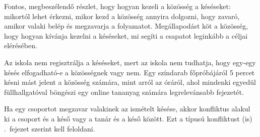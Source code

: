 Fontos, megbeszélendő részlet, hogy hogyan kezeli a közösség a késéseket: mikortól lehet érkezni, mikor kezd a közösség annyira dolgozni, hogy zavaró, amikor valaki belép és megzavarja a folyamatot. Megállapodást köt a közösség, hogy hogyan kívánja kezelni a késéseket, mi segíti a csapatot leginkább a céljai elérésében.

Az iskola nem regisztrálja a késéseket, mert az iskola nem tudhatja, hogy egy-egy késés elfogadható-e a közösségnek vagy nem. Egy színdarab főpróbájáról 5 percet késni mást jelent a közösség számára, mint arról az óráról, ahol mindenki egyedül füllhallgatóval böngészi egy online tananyag számára legrelevánsabb fejezetét.

Ha egy csoportot megzavar valakinek az ismételt késése, akkor konfliktus alakul ki a csoport és a késő vagy a tanár és a késő között. Ezt a típusú konfliktust (is) .~fejezet szerint kell feloldani.